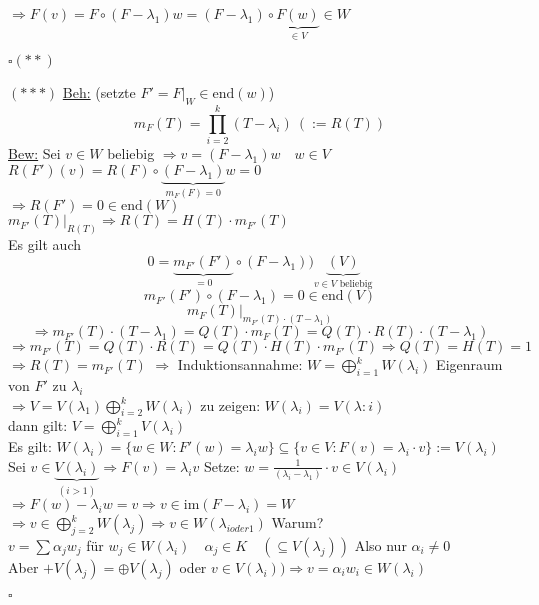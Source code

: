 \documentclass[titlepage,12pt,a4paper,ngerman]{report}
\newcommand{\tx}[1]{\textrm{#1}}
\newcommand{\ub}[1]{\underbrace{#1}}
\newcommand{\im}{\tx{im}}
\begin{document}
$\Rightarrow F(v) = F \circ (F-\lambda_1) w = (F-\lambda_1) \circ \ub{F(w)}_{\in V} \in W$
\begin{flushright}
	$ \square (**)$
\end{flushright}
$(***)$ \underline{Beh:} (setzte $ F' = F|_W \in \tx{end}(w) $)\\
$$m_F(T) = \prod_{i=2}^{k} (T-\lambda_i) \ (:= R(T))$$
\underline{Bew:} Sei $v\in W$ beliebig $ \Rightarrow  v= (F-\lambda_1)w \quad w \in V$\\
$R(F')(v) = R(F) \circ \ub{(F-\lambda_1)}_{m_F(F) = 0}w = 0 $\\
$\Rightarrow R(F') = 0 \in \tx{end} (W)$\\$ m_{F'}(T) |_{R(T)} \Rightarrow R(T) = H(T) \cdot m_{F'}(T)$\\
Es gilt auch 
$$ 0 = \ub{ m_{F'}(F')}_{=0} \circ (F-\lambda_1))\ub{(V)}_{v \in V \tx{ beliebig}}$$
$$m_{F'}(F') \circ (F-\lambda_1) = 0 \in \tx{end}(V)$$
$$m_F(T) |_{m_{F'}(T) \cdot (T-\lambda_1)}$$
$$ \Rightarrow m_{F'} (T) \cdot (T-\lambda_1) = Q(T) \cdot m_F(T) = Q(T) \cdot R(T) \cdot (T-\lambda_1)$$
$$ \Rightarrow m_{F'}(T) = Q(T) \cdot R(T) = Q(T) \cdot H(T) \cdot m_{F'}(T) \Rightarrow Q(T)  = H(T) = 1$$
$\Rightarrow R(T) = m_{F'}(T)$
$\Rightarrow$ Induktionsannahme: $ W = \bigoplus\limits_{i=1}^{k} W(\lambda_i)  $ Eigenraum von $ F' $ zu $  \lambda_i $ \\
$\Rightarrow V = V(\lambda_1) \bigoplus\limits_{i=2}^{k} W(\lambda_i)$ zu zeigen: $ W(\lambda_i)  = V(\lambda:i) $\\
dann gilt: $ V = \bigoplus\limits_{i=1}^{k} V(\lambda_i) $\\
Es gilt: $  W(\lambda_i) = \{w\in W: F'(w) = \lambda_i w\}  \subseteq \{v \in V : F(v) = \lambda_i \cdot v\} := V(\lambda_i)$ 
Sei $  v\in \ub{V(\lambda_i)}_{(i>1)} \Rightarrow F(v) = \lambda_i v$ Setze: $ w = \frac{1}{(\lambda_i - \lambda_1)} \cdot v \in V(\lambda_i) $\\
$ \Rightarrow F(w) - \lambda_i w = v \Rightarrow v \in \im(F-\lambda_i) = W $\\
$ \Rightarrow v \in \bigoplus\limits _{j=2}^{k} W(\lambda_j)  \Rightarrow v \in W(\lambda_{ i oder 1 })$ Warum?\\
$ v = \sum \alpha_j w_j $ für $ w_j \in W(\lambda_i) \quad \alpha_j \in K \quad (\subseteq V(\lambda_j))$ Also nur $ \alpha_i \neq 0 $ \\
Aber $ + V(\lambda_j) = \oplus V(\lambda_j) $ oder $ v \in V(\lambda_i)) \Rightarrow v = \alpha_i w_i \in W(\lambda_i)$	


\begin{flushright}
	$ \square $
\end{flushright}
\end{document}
